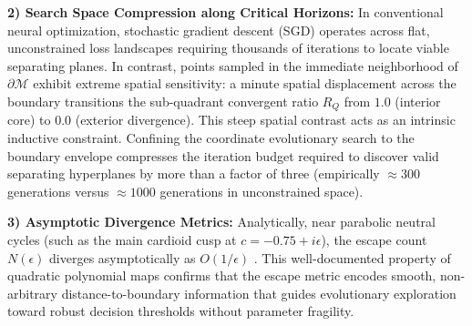 \documentclass[10pt,journal,compsoc,twocolumn]{article}
\begin{document}
\textbf{2) Search Space Compression along Critical Horizons:} In conventional neural optimization, stochastic gradient descent (SGD) operates across flat, unconstrained loss landscapes requiring thousands of iterations to locate viable separating planes. In contrast, points sampled in the immediate neighborhood of $\partial \mathcal{M}$ exhibit extreme spatial sensitivity: a minute spatial displacement across the boundary transitions the sub-quadrant convergent ratio $R_Q$ from $1.0$ (interior core) to $0.0$ (exterior divergence). This steep spatial contrast acts as an intrinsic inductive constraint. Confining the coordinate evolutionary search to the boundary envelope compresses the iteration budget required to discover valid separating hyperplanes by more than a factor of three (empirically $\approx 300$ generations versus $\approx 1000$ generations in unconstrained space).

\textbf{3) Asymptotic Divergence Metrics:} Analytically, near parabolic neutral cycles (such as the main cardioid cusp at $c = -0.75 + i\epsilon$), the escape count $N(\epsilon)$ diverges asymptotically as $O(1/\epsilon)$ \cite{peitgen1992chaos}. This well-documented property of quadratic polynomial maps confirms that the escape metric encodes smooth, non-arbitrary distance-to-boundary information that guides evolutionary exploration toward robust decision thresholds without parameter fragility.
\end{document}
